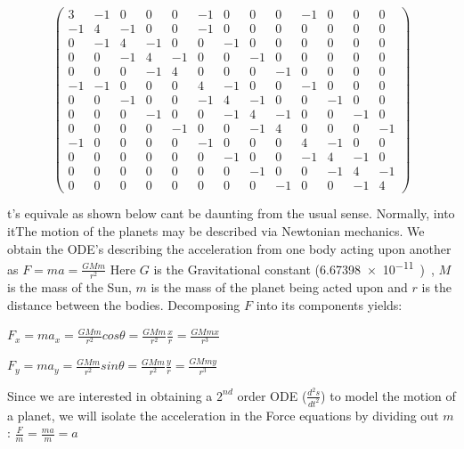 \documentclass{report}
\begin{document}
\begin{enumerate}
\[ \left( \begin{array}{ccccccccccccc}
3&-1&0&0&0&-1&0&0&0&-1&0&0&0 \\
-1&4&-1&0&0&-1&0&0&0&0&0&0&0 \\
0&-1&4&-1&0&0&-1&0&0&0&0&0&0 \\
0&0&-1&4&-1&0&0&-1&0&0&0&0&0 \\
0&0&0&-1&4&0&0&0&-1&0&0&0&0 \\
-1&-1&0&0&0&4&-1&0&0&-1&0&0&0 \\
0&0&-1&0&0&-1&4&-1&0&0&-1&0&0 \\
0&0&0&-1&0&0&-1&4&-1&0&0&-1&0 \\
0&0&0&0&-1&0&0&-1&4&0&0&0&-1 \\
-1&0&0&0&0&-1&0&0&0&4&-1&0&0 \\
0&0&0&0&0&0&-1&0&0&-1&4&-1&0 \\
0&0&0&0&0&0&0&-1&0&0&-1&4&-1 \\
0&0&0&0&0&0&0&0&-1&0&0&-1&4 \end{array} \right)\] 


t's equivale as shown below cant be daunting from the usual sense. Normally, into itThe motion of the planets may be described via Newtonian mechanics. We obtain the ODE's describing the acceleration from one body acting upon another as $\displaystyle F = ma = \frac{GMm}{r^2}$
Here $G$ is the Gravitational constant (\SI{6.67398e-11}), $M$ is the mass of the Sun, $m$ is the mass of the planet being acted upon and $r$ is the distance between the bodies. Decomposing $F$ into its components yields:
\begin{center}
$\displaystyle F_x = ma_x = \frac{GMm}{r^2}cos\theta = \frac{GMm}{r^2}\frac{x}{r} = \frac{GMmx}{r^3}$
\end{center}

\begin{center}
$\displaystyle F_y = ma_y = \frac{GMm}{r^2}sin\theta = \frac{GMm}{r^2}\frac{y}{r} = \frac{GMmy}{r^3}$
\end{center}

Since we are interested in obtaining a $2^{nd}$ order ODE ($\displaystyle \frac{d^2s}{dt^2}$) to model the motion of a planet, we will isolate the acceleration in the Force equations by dividing out $m$:  $\displaystyle \frac{F}{m} = \frac{ma}{m} = a$



\end{enumerate}
\end{document}
